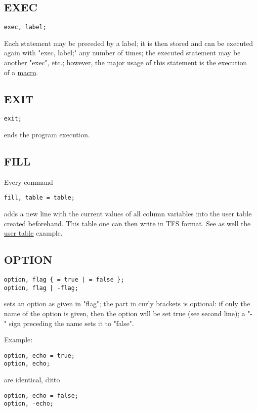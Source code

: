 \subsection{EXEC}
\begin{verbatim}
exec, label;
\end{verbatim} 
Each statement may be preceded by a label; it is then stored and can be
executed again with "exec, label;" any number of times; the executed
statement may be another "exec", etc.; however, the major usage of this
statement is the execution of a \href{special.html#macro}{macro}.  

\subsection{EXIT}
\begin{verbatim}
exit;
\end{verbatim} 
ends the program execution. 

\subsection{FILL} 
Every command 
\begin{verbatim}
fill, table = table;
\end{verbatim} 
adds a new line with the current values of all column variables into the
user table \hyperlink{create}{create}d beforehand. This table one can
then \hyperlink{write}{write} in TFS format.  See as well the
\href{../Introduction/select.html#ucreate}{user table} example.  

\subsection{OPTION}
\label{subsec:general_option}
\begin{verbatim}
option, flag { = true | = false };
option, flag | -flag;
\end{verbatim} 
sets an option as given in "flag"; the part in curly brackets is
optional: if only the name of the option is given, then the option will
be set true (see second line); a "-" sign preceding the name sets it to
"false".  

Example: 
\begin{verbatim}
option, echo = true;
option, echo;
\end{verbatim} 
are identical, ditto 
\begin{verbatim}
option, echo = false;
option, -echo;
\end{verbatim} 

